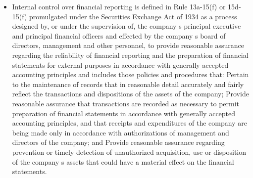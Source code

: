 \begin{itemize}
    \item Internal control over financial reporting is defined in Rule 13a-15(f) or 15d-15(f) promulgated under the Securities Exchange Act of 1934 as a process designed by, or under the supervision of, the company s principal executive and principal financial officers and effected by the company s board of directors, management and other personnel, to provide reasonable assurance regarding the reliability of financial reporting and the preparation of financial statements for external purposes in accordance with generally accepted accounting principles and includes those policies and procedures that: Pertain to the maintenance of records that in reasonable detail accurately and fairly reflect the transactions and dispositions of the assets of the company; Provide reasonable assurance that transactions are recorded as necessary to permit preparation of financial statements in accordance with generally accepted accounting principles, and that receipts and expenditures of the company are being made only in accordance with authorizations of management and directors of the company; and Provide reasonable assurance regarding prevention or timely detection of unauthorized acquisition, use or disposition of the company s assets that could have a material effect on the financial statements.

\end{itemize}
